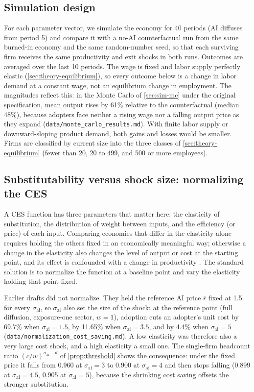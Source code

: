 \subsection{Simulation design}\label{sec:sim-design}

For each parameter vector, we simulate the economy for 40 periods (AI diffuses from period 5) and compare it with a no-AI counterfactual run from the same burned-in economy and the same random-number seed, so that each surviving firm receives the same productivity and exit shocks in both runs.
Outcomes are averaged over the last 10 periods.
The wage is fixed and labor supply perfectly elastic (\cref{sec:theory-equilibrium}), so every outcome below is a change in labor demand at a constant wage, not an equilibrium change in employment.
The magnitudes reflect this: in the Monte Carlo of \cref{sec:sim-mc} under the original specification, mean output rises by 61\% relative to the counterfactual (median 48\%), because adopters face neither a rising wage nor a falling output price as they expand (\texttt{data/monte\_carlo\_results.md}).
With finite labor supply or downward-sloping product demand, both gains and losses would be smaller.
Firms are classified by current size into the three classes of \cref{sec:theory-equilibrium} (fewer than 20, 20 to 499, and 500 or more employees).

\subsection{Substitutability versus shock size: normalizing the CES}\label{sec:sim-normalization}

A CES function has three parameters that matter here: the elasticity of substitution, the distribution of weight between inputs, and the efficiency (or price) of each input.
Comparing economies that differ in the elasticity alone requires holding the others fixed in an economically meaningful way; otherwise a change in the elasticity also changes the level of output or cost at the starting point, and its effect is confounded with a change in productivity \citep{klump2000growth,leonledesma2010identifying}.
The standard solution is to normalize the function at a baseline point and vary the elasticity holding that point fixed.

Earlier drafts did not normalize.
They held the reference AI price $\bar r$ fixed at 1.5 for every $\sigma_{\text{ai}}$, so $\sigma_{\text{ai}}$ also set the size of the shock: at the reference point (full diffusion, exposure-one sector, $w = 1$), adoption cuts an adopter's unit cost by 69.7\% when $\sigma_{\text{ai}} = 1.5$, by 11.65\% when $\sigma_{\text{ai}} = 3.5$, and by 4.4\% when $\sigma_{\text{ai}} = 5$ (\texttt{data/normalization\_cost\_saving.md}).
A low elasticity was therefore also a very large cost shock, and a high elasticity a small one.
The single-firm headcount ratio $(c/w)^{\sigma_{\text{ai}} - \theta}$ of \cref{prop:threshold} shows the consequence: under the fixed price it falls from 0.960 at $\sigma_{\text{ai}} = 3$ to 0.900 at $\sigma_{\text{ai}} = 4$ and then stops falling (0.899 at $\sigma_{\text{ai}} = 4.5$, 0.905 at $\sigma_{\text{ai}} = 5$), because the shrinking cost saving offsets the stronger substitution.

